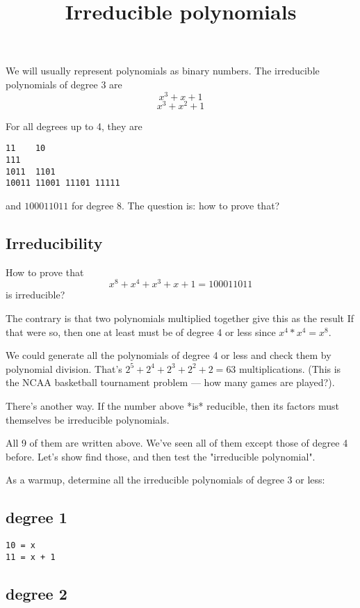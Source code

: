 \documentclass[11pt, oneside]{article}
\title{Irreducible polynomials}
\date{}
\begin{document}
\maketitle
\Large

We will usually represent polynomials as binary numbers.  The irreducible polynomials of degree 3 are
\[ x^3 + x + 1 \]
\[ x^3 + x^2 + 1 \]

For all degrees up to 4, they are

\begin{verbatim}
11    10
111
1011  1101
10011 11001 11101 11111
\end{verbatim}

and $100011011$ for degree 8.  The question is:  how to prove that?

\subsection*{Irreducibility}

How to prove that
\[ x^8 + x^4 + x^3 + x + 1 = 100011011 \]
 is irreducible?

The contrary is that two polynomials multiplied together give this as the result  If that were so, then one at least must be of degree 4 or less since $x^4 * x^4 = x^8$.  

We could generate all the polynomials of degree 4 or less and check them by polynomial division.  That's $2^5 + 2^4 + 2^3 + 2^2 + 2 = 63$ multiplications.  (This is the NCAA basketball tournament problem --- how many games are played?).

There's another way.  If the number above *is* reducible, then its factors must themselves be irreducible polynomials.  

All 9 of them are written above.  We've seen all of them except those of degree 4 before.  Let's show find those, and then test the "irreducible polynomial".

As a warmup, determine all the irreducible polynomials of degree 3 or less:

\subsection*{degree 1}

\begin{verbatim}
10 = x
11 = x + 1
\end{verbatim}

\subsection*{degree 2}
\end{document}
